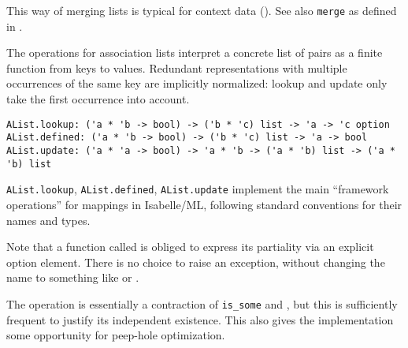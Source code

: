 \begin{isabellebody}
\begin{isamarkuptext}
  This way of merging lists is typical for context data
  ().  See also \verb|merge| as defined in
  \hyperlink{file.~~/src/Pure/library.ML}{\mbox{}}.%
\end{isamarkuptext}%
\isamarkuptrue%
%
\isamarkuptrue%
%
\begin{isamarkuptext}%
The operations for association lists interpret a concrete list
  of pairs as a finite function from keys to values.  Redundant
  representations with multiple occurrences of the same key are
  implicitly normalized: lookup and update only take the first
  occurrence into account.%
\end{isamarkuptext}%
\isamarkuptrue%
%
\begin{isamarkuptext}%
\begin{mldecls}
  \verb|AList.lookup: ('a * 'b -> bool) -> ('b * 'c) list -> 'a -> 'c option| \\
  \verb|AList.defined: ('a * 'b -> bool) -> ('b * 'c) list -> 'a -> bool| \\
  \verb|AList.update: ('a * 'a -> bool) -> 'a * 'b -> ('a * 'b) list -> ('a * 'b) list| \\
  \end{mldecls}

  \begin{description}

  \item \verb|AList.lookup|, \verb|AList.defined|, \verb|AList.update|
  implement the main ``framework operations'' for mappings in
  Isabelle/ML, following standard conventions for their names and
  types.

  Note that a function called  is obliged to express its
  partiality via an explicit option element.  There is no choice to
  raise an exception, without changing the name to something like
   or .

  The  operation is essentially a contraction of \verb|is_some| and , but this is sufficiently frequent to
  justify its independent existence.  This also gives the
  implementation some opportunity for peep-hole optimization.

  \end{description}


\end{isamarkuptext}
\end{isabellebody}
